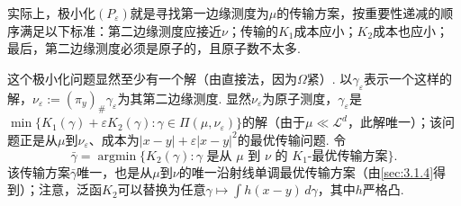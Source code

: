 实际上，极小化$(P_\varepsilon)$就是寻找第一边缘测度为$\mu$的传输方案，按重要性递减的顺序满足以下标准：第二边缘测度应接近$\nu$；传输的$K_1$成本应小；$K_2$成本也应小；最后，第二边缘测度必须是原子的，且原子数不太多.

这个极小化问题显然至少有一个解（由直接法，因为$\Omega$紧）. 以$\gamma_\varepsilon$表示一个这样的解，$\nu_\varepsilon:=(\pi_y)_\#\gamma_\varepsilon$为其第二边缘测度. 显然$\nu_\varepsilon$为原子测度，$\gamma_\varepsilon$是$\min\{K_1(\gamma)+\varepsilon K_2(\gamma):\gamma\in\Pi(\mu,\nu_\varepsilon)\}$的解（由于$\mu\ll\mathscr L^d$，此解唯一）；该问题正是从$\mu$到$\nu_\varepsilon$、成本为$|x-y|+\varepsilon|x-y|^2$的最优传输问题. 令
\begin{equation}\label{eq:3.4}
\bar\gamma=\operatorname*{argmin}\{K_2(\gamma):\gamma\text{ 是从 }\mu\text{ 到 }\nu\text{ 的 }K_1\text{-最优传输方案}\}.
\end{equation}
该传输方案$\bar\gamma$唯一，也是从$\mu$到$\nu$的唯一沿射线单调最优传输方案（由\autoref{sec:3.1.4}得到）；注意，泛函$K_2$可以替换为任意$\gamma\mapsto\int h(x-y)\,d\gamma$，其中$h$严格凸.

